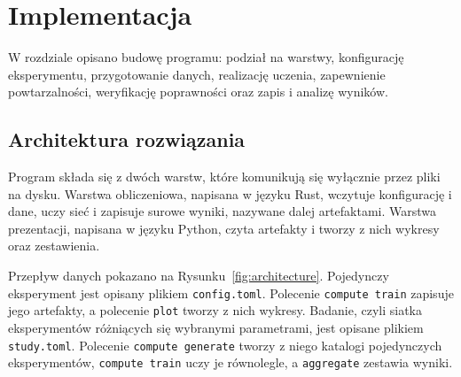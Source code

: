 \section{Implementacja}
\label{sec:implementation}

W rozdziale opisano budowę programu: podział na warstwy, konfigurację eksperymentu, przygotowanie danych, realizację uczenia, zapewnienie powtarzalności, weryfikację poprawności oraz zapis i analizę wyników.

\subsection{Architektura rozwiązania}
\label{sec:implementation-architecture}

Program składa się z dwóch warstw, które komunikują się wyłącznie przez pliki na dysku. Warstwa obliczeniowa, napisana w języku Rust, wczytuje konfigurację i dane, uczy sieć i zapisuje surowe wyniki, nazywane dalej artefaktami. Warstwa prezentacji, napisana w języku Python, czyta artefakty i tworzy z nich wykresy oraz zestawienia.

Przepływ danych pokazano na Rysunku~\ref{fig:architecture}. Pojedynczy eksperyment jest opisany plikiem \texttt{config.toml}. Polecenie \texttt{compute train} zapisuje jego artefakty, a polecenie \texttt{plot} tworzy z nich wykresy. Badanie, czyli siatka eksperymentów różniących się wybranymi parametrami, jest opisane plikiem \texttt{study.toml}. Polecenie \texttt{compute generate} tworzy z niego katalogi pojedynczych eksperymentów, \texttt{compute train} uczy je równolegle, a \texttt{aggregate} zestawia wyniki.

